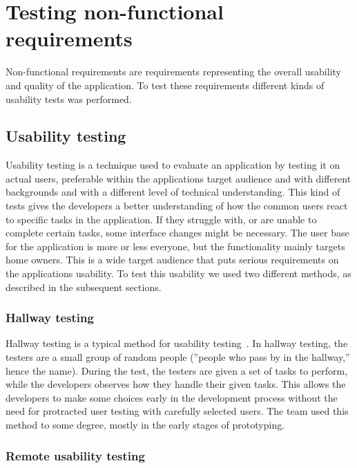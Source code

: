 \section{Testing non-functional requirements}
\label{sec:testingnonfunctionalrequirements}
Non-functional requirements are requirements representing the overall usability and quality of the application. To test these requirements different kinds of usability tests was performed.

\subsection{Usability testing}
\label{sec:userTest}

Usability testing is a technique used to evaluate an application by testing it on actual users, preferable within the applications target audience and with different backgrounds and with a different level of technical understanding. This kind of tests gives the developers a better understanding of how the common users react to specific tasks in the application. If they struggle with, or are unable to complete certain tasks, some interface changes might be necessary.
The user base for the application is more or less everyone, but the functionality mainly targets home owners. This is a wide target audience that puts serious requirements on the applications usability. To test this usability we used two different methods, as described in the subsequent sections.

\subsubsection{Hallway testing}
Hallway testing is a typical method for usability testing~\cite{hallwaytesting}. In hallway testing, the testers are a small group of random people (''people who pass by in the hallway,'' hence the name). During the test, the testers are given a set of tasks to perform, while the developers observes how they handle their given tasks. This allows the developers to make some choices early in the development process without the need for protracted user testing with carefully selected users. 
The team used this method to some degree, mostly in the early stages of prototyping.


\subsubsection{Remote usability testing}


